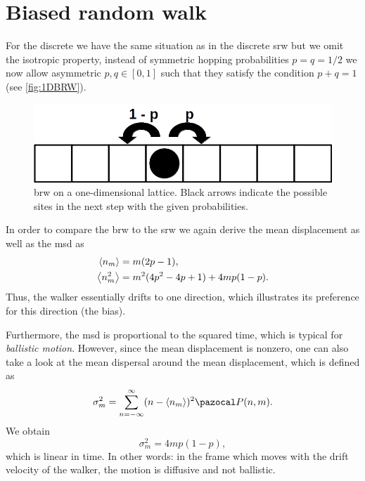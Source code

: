 \section{Biased random walk}
For the discrete  we have the same situation as in the discrete \ac{srw} but we omit the isotropic property, \ie instead of symmetric hopping probabilities $p = q = 1/2$ we now allow asymmetric $p, q \in [0,1]$ such that they satisfy the condition $p + q = 1$ (see \autoref{fig:1DBRW}).

\begin{figure}[bth]
 \myfloatalign
 \includegraphics[width=0.8\linewidth]{gfx/1DBRW}
 \caption[\acl{brw} on a one-dimensional lattice]{\ac{brw} on a one-dimensional lattice. Black arrows indicate the possible sites in the next step with the given probabilities.}\label{fig:1DBRW}
\end{figure}

In order to compare the \ac{brw} to the \ac{srw} we again derive the mean displacement as well as the \ac{msd} as 
\begin{equation*} 
 \begin{aligned}
  \left<n_m\right> &= m (2p - 1),
  \\
  \left<n^2_m\right> &= m^2 (4p^2 - 4p +1) + 4mp (1 - p).
 \end{aligned}
\end{equation*}
Thus, the walker essentially drifts to one direction, which illustrates its preference for this direction (the bias).

Furthermore, the \ac{msd} is proportional to the squared time, which is typical for \textit{ballistic motion}. However, since the mean displacement is nonzero, one can also take a look at the mean dispersal around the mean displacement, which is defined as
\begin{equation*}
 \sigma^2_m = \sum\limits_{n = -\infty}^\infty (n - \avg{n_m})^2 \P(n, m).
\end{equation*}
We obtain
\begin{equation*}
 \sigma^2_m = 4mp(1-p),
\end{equation*}
which is linear in time. In other words: in the frame which moves with the drift velocity of the walker, the motion is diffusive and not ballistic.

